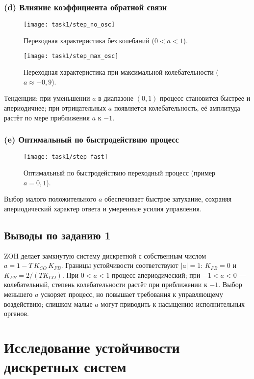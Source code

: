 \subsection*{(d) Влияние коэффициента обратной связи}
\begin{figure}[H]
  \centering
  \texttt{[image: task1/step\_no\_osc]}
  \caption{Переходная характеристика без колебаний (\(0<a<1\)).}
  \label{fig:task1_no_osc}
\end{figure}
\begin{figure}[H]
  \centering
  \texttt{[image: task1/step\_max\_osc]}
  \caption{Переходная характеристика при максимальной колебательности (\(a\approx-0{,}9\)).}
  \label{fig:task1_max_osc}
\end{figure}
Тенденции: при уменьшении \(a\) в диапазоне \((0,1)\) процесс становится быстрее и апериодичнее; при отрицательных \(a\) появляется колебательность, её амплитуда растёт по мере приближения \(a\) к \(-1\).

\subsection*{(e) Оптимальный по быстродействию процесс}
\begin{figure}[H]
  \centering
  \texttt{[image: task1/step\_fast]}
  \caption{Оптимальный по быстродействию переходный процесс (пример \(a=0{,}1\)).}
  \label{fig:task1_fast}
\end{figure}
Выбор малого положительного \(a\) обеспечивает быстрое затухание, сохраняя апериодический характер ответа и умеренные усилия управления.

\section{Выводы по заданию 1}
ZOH делает замкнутую систему дискретной с собственным числом \(a=1-T\,K_{CO}\,K_{FB}\). Границы устойчивости соответствуют \(|a|=1\): \(K_{FB}=0\) и \(K_{FB}=2/(T K_{CO})\). При \(0<a<1\) процесс апериодический; при \(-1<a<0\) — колебательный, степень колебательности растёт при приближении к \(-1\). Выбор меньшего \(a\) ускоряет процесс, но повышает требования к управляющему воздействию; слишком малые \(a\) могут приводить к насыщению исполнительных органов.

\chapter{Исследование устойчивости дискретных систем}
